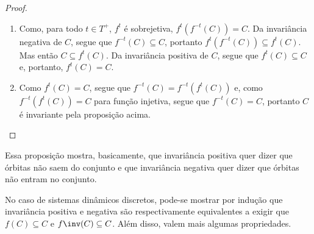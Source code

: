 \begin{proof}
\begin{enumerate}
	\item Como, para todo $t \in T^+$, $f^t$ é sobrejetiva, $f^t(f^{-t}(C))=C$. Da invariância negativa de $C$, segue que $f^{-t}(C) \subseteq C$, portanto $f^t(f^{-t}(C)) \subseteq f^t(C)$. Mas então $C \subseteq f^t(C)$. Da invariância positiva de $C$, segue que $f^t(C) \subseteq C$ e, portanto, $f^t(C)=C$.

	\item Como $f^t(C) = C$, segue que $f^{-t}(C) = f^{-t}(f^t(C))$ e, como $f^{-t}(f^t(C)) = C$ para função injetiva, segue que $f^{-t}(C) = C$, portanto $C$ é invariante pela proposição acima. \qedhere
	\end{enumerate}
\end{proof}

Essa proposição mostra, basicamente, que invariância positiva quer dizer que órbitas não saem do conjunto e que invariância negativa quer dizer que órbitas não entram no conjunto.


No caso de sistemas dinâmicos discretos, pode-se mostrar por indução que invariância positiva e negativa são respectivamente equivalentes a exigir que $f(C) \subseteq C$ e $f\inv(C) \subseteq C$. Além disso, valem mais algumas propriedades.


